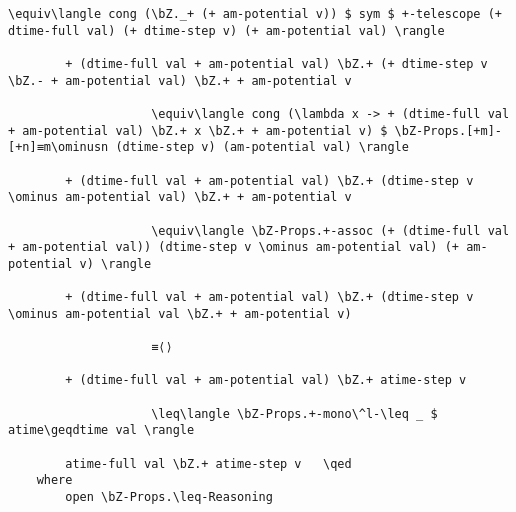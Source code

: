 \begin{lstlisting}[caption={Amortized time bounds actual time from above},label={lst:appendix:atime-proof}]
                    \equiv\langle cong (\bZ._+ (+ am-potential v)) $ sym $ +-telescope (+ dtime-full val) (+ dtime-step v) (+ am-potential val) \rangle

        + (dtime-full val + am-potential val) \bZ.+ (+ dtime-step v \bZ.- + am-potential val) \bZ.+ + am-potential v

                    \equiv\langle cong (\lambda x -> + (dtime-full val + am-potential val) \bZ.+ x \bZ.+ + am-potential v) $ \bZ-Props.[+m]-[+n]≡m\ominusn (dtime-step v) (am-potential val) \rangle

        + (dtime-full val + am-potential val) \bZ.+ (dtime-step v \ominus am-potential val) \bZ.+ + am-potential v

                    \equiv\langle \bZ-Props.+-assoc (+ (dtime-full val + am-potential val)) (dtime-step v \ominus am-potential val) (+ am-potential v) \rangle

        + (dtime-full val + am-potential val) \bZ.+ (dtime-step v \ominus am-potential val \bZ.+ + am-potential v)

                    ≡⟨⟩

        + (dtime-full val + am-potential val) \bZ.+ atime-step v

                    \leq\langle \bZ-Props.+-mono\^l-\leq _ $ atime\geqdtime val \rangle

        atime-full val \bZ.+ atime-step v   \qed
    where
        open \bZ-Props.\leq-Reasoning
\end{lstlisting}